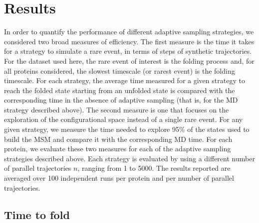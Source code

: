 

\section{\label{sec:results}Results}

In order to quantify the performance of different adaptive sampling strategies,
we considered two broad measures of efficiency. The first measure is the time
it takes for a strategy to simulate a rare event, in terms of steps of synthetic
trajectories. For the dataset used here, the rare event of interest is the
folding process and, for all proteins considered, the slowest timescale (or
rarest event) is the folding timescale. For each strategy, the average time measured
for a given strategy to reach the folded state starting from an unfolded state
is compared with the corresponding time in the absence of adaptive sampling
(that is, for the MD strategy described above). The second measure is one
that focuses on the exploration of the configurational space instead of a single
rare event. For any given strategy, we measure the time needed to explore 95\%
of the states used to build the MSM and compare it with the corresponding MD time.
For each protein, we evaluate these two measures for each of the adaptive
sampling strategies described above. Each strategy is evaluated by using a different
number of parallel trajectories $n$, ranging from 1 to 5000. 
The results reported
are averaged over 100 independent runs per protein and per number of parallel
trajectories.

\subsection{\label{sec:time-fold}Time to fold}

